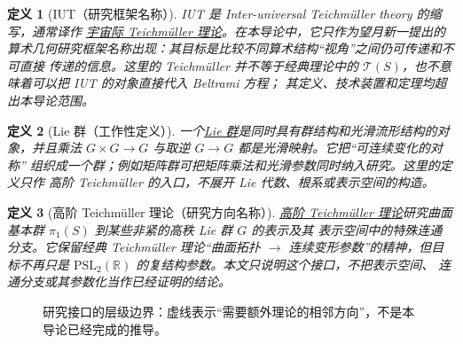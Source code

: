 \documentclass[UTF8,fontset=none,a4paper,11pt]{ctexart}
\theoremstyle{foundation-definition}
\newtheorem{definition}{定义}[section]
\theoremstyle{foundation-theorem}
\theoremstyle{foundation-proposition}
\theoremstyle{foundation-example}
\theoremstyle{foundation-remark}
\theoremstyle{foundation-theorem}
\newcommand{\T}{\mathcal T}
\newcommand{\M}{\mathcal M}
\newcommand{\term}[2]{\hyperref[#1]{#2}}
\begin{document}
\begin{definition}[IUT（研究框架名称）]\label{def:iut-program}
IUT 是 \emph{Inter-universal Teichmüller theory} 的缩写，通常译作
\term{def:iut-program}{宇宙际 Teichmüller 理论}。在本导论中，它只作为望月新一提出的
算术几何研究框架名称出现：其目标是比较不同算术结构“视角”之间仍可传递和不可直接
传递的信息。这里的 Teichmüller 并不等于经典理论中的
\(\term{def:teich}{\T(S)}\)，也不意味着可以把 IUT 的对象直接代入 Beltrami 方程；
其定义、技术装置和定理均超出本导论范围。
\end{definition}

\begin{definition}[Lie 群（工作性定义）]\label{def:lie-group}
一个\term{def:lie-group}{Lie 群}是同时具有群结构和光滑流形结构的对象，并且乘法
\(G\times G\to G\) 与取逆 \(G\to G\) 都是光滑映射。它把“可连续变化的对称”
组织成一个群；例如矩阵群可把矩阵乘法和光滑参数同时纳入研究。这里的定义只作
高阶 Teichmüller 的入口，不展开 Lie 代数、根系或表示空间的构造。
\end{definition}

\begin{definition}[高阶 Teichmüller 理论（研究方向名称）]\label{def:higher-teichmuller}
\term{def:higher-teichmuller}{高阶 Teichmüller 理论}研究曲面基本群
\(\term{def:fundamental-group}{\pi_1(S)}\) 到某些非紧的高秩 Lie 群 \(G\) 的表示及其
表示空间中的特殊连通分支。它保留经典 Teichmüller 理论“曲面拓扑
\(\longrightarrow\) 连续变形参数”的精神，但目标不再只是
\(\mathrm{PSL}_2(\mathbb R)\) 的复结构参数。本文只说明这个接口，不把表示空间、
连通分支或其参数化当作已经证明的结论。
\end{definition}

\begin{figure}[htbp]
\centering
{}
\caption{研究接口的层级边界：虚线表示“需要额外理论的相邻方向”，不是本导论已经完成的推导。}
\label{fig:advanced-boundaries}
\end{figure}
\end{document}
